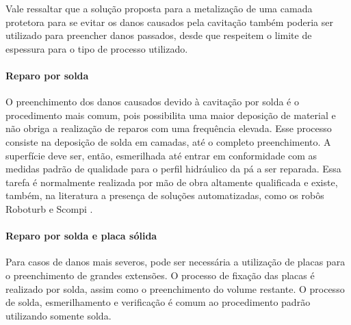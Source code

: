Vale ressaltar que a solução proposta para a metalização de uma camada protetora
para se evitar os danos causados pela cavitação também poderia ser utilizado
para preencher danos passados, desde que respeitem o limite de espessura
para o tipo de processo utilizado.


\paragraph{Reparo por solda}

O preenchimento dos danos causados devido à cavitação por solda é o procedimento
mais comum, pois possibilita uma maior deposição de material e não obriga a
realização de reparos com uma frequência elevada. Esse processo consiste na
deposição de solda em camadas, até o completo preenchimento. A
superfície deve ser, então, esmerilhada até entrar em conformidade com as
medidas padrão de qualidade para o perfil hidráulico da pá a ser reparada. Essa tarefa
é normalmente realizada por mão de obra altamente qualificada e existe, também,
na literatura a presença de soluções automatizadas, como os robôs Roboturb e Scompi
\citep{roboturb,scompi}.

\paragraph{Reparo por solda e placa sólida}

Para casos de danos mais severos, pode ser necessária a utilização de placas
para o preenchimento de grandes extensões. O processo de fixação das placas é
realizado por solda, assim como o preenchimento do volume restante. O processo
de solda, esmerilhamento e verificação é comum ao procedimento padrão utilizando
somente solda.
















